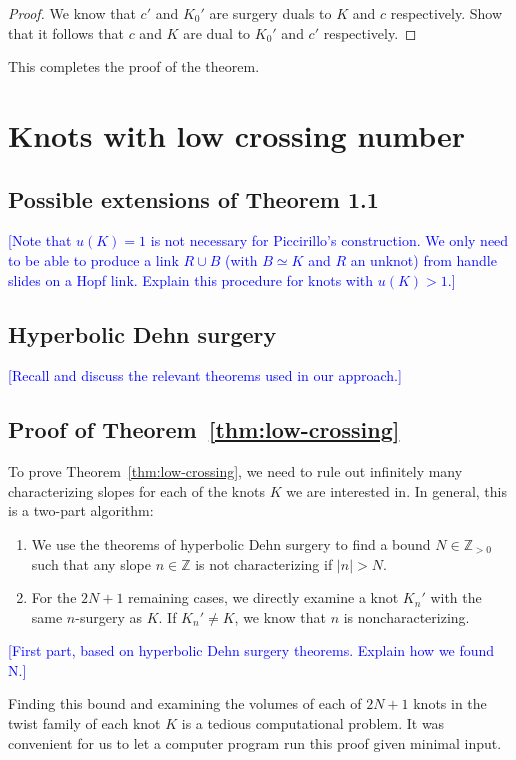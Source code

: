 \documentclass[11pt,usenames,dvipsnames,reqno]{amsart}
\newcommand{\zz}{\mathbb{Z}}
\numberwithin{theorem}{section}
\theoremstyle{ex}
\theoremstyle{rem}
\def\kh#1{\textcolor{Blue}{#1}}
\begin{document}
\begin{proof}
	We know that $c'$ and $K_0'$ are surgery duals to $K$ and $c$ respectively. Show that it follows that $c$ and $K$ are dual to $K_0'$ and $c'$ respectively.
\end{proof}
This completes the proof of the theorem.

\section{Knots with low crossing number}

\subsection{Possible extensions of Theorem 1.1} \kh{[Note that $u(K)=1$ is not necessary for Piccirillo's construction. We only need to be able to produce a link $R\cup B$ (with $B\simeq K$ and $R$ an unknot) from handle slides on a Hopf link. Explain this procedure for knots with $u(K)>1$.]}

\subsection{Hyperbolic Dehn surgery} \kh{[Recall and discuss the relevant theorems used in our approach.]}

\subsection{Proof of Theorem~\ref{thm:low-crossing}}

To prove Theorem~\ref{thm:low-crossing}, we need to rule out infinitely many characterizing slopes for each of the knots $K$ we are interested in. In general, this is a two-part algorithm:

\begin{enumerate}
	\item We use the theorems of hyperbolic Dehn surgery to find a bound $N \in \zz_{>0}$ such that any slope $n \in \zz$ is not characterizing if $|n|>N$.
	\item For the $2 N + 1$ remaining cases, we directly examine a knot $K_{n}'$ with the same $n$-surgery as $K$. If $K_{n}' \neq K$, we know that $n$ is noncharacterizing.
\end{enumerate}

\kh{[First part, based on hyperbolic Dehn surgery theorems. Explain how we found N.]}

Finding this bound and examining the volumes of each of $2 N + 1$ knots in the twist family of each knot $K$ is a tedious computational problem. It was convenient for us to let a computer program run this proof given minimal input.
\end{document}
